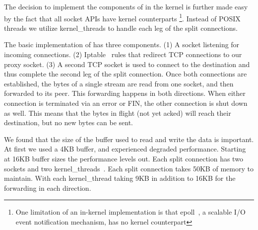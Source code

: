 The decision to implement the components of \oursys in the kernel is further made easy by the fact that all socket APIs have kernel counterparts \footnote{One limitation of an in-kernel implementation is that epoll~\cite{epoll}, a scalable I/O event notification mechanism, has no kernel counterpart}. Instead of POSIX threads we utilize kernel\_threads to handle each leg of the split connections. 

 The basic implementation of \oursys has three components. (1) A socket listening for incoming connections. (2) Iptable~\cite{iptables} rules that redirect TCP connections to our proxy socket. (3) A second TCP socket is used to connect to the destination and thus complete the second leg of the split connection. Once both connections are established, the bytes of a single stream are read from one socket, and then forwarded to its peer. This forwarding happens in both directions. When either connection is terminated via an error or FIN, the other connection is shut down as well. This means that the bytes in flight (\ie not yet acked) will reach their destination, but no new bytes can be sent.

 We found that the size of the buffer used to read and write the data is important. At first we used  a 4KB buffer, and experienced degraded performance. Starting at 16KB buffer sizes the performance levels out. Each split connection has two sockets and two kernel\_threads~\cite{kthread}. Each split connection takes 50KB of memory to maintain. With  each kernel\_thread taking 9KB in addition to 16KB for the forwarding in each direction.

